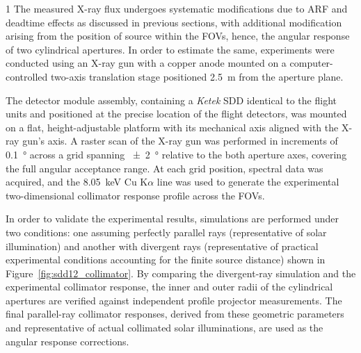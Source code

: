 \documentclass[12pt]{spieman}  %
\begin{document}
\begin{spacing}{1}
The measured X-ray flux undergoes systematic modifications due to ARF and deadtime effects as discussed in previous sections, with additional modification arising from the position of source within the FOVs, hence, the angular response of two cylindrical apertures. 
In order to estimate the same, experiments were conducted using an X-ray gun with a copper anode mounted on a computer-controlled two-axis translation stage positioned \SI{2.5}{\metre} from the aperture plane.%

The detector module assembly, containing a \textit{Ketek} SDD 
identical to the flight units and positioned at the precise location of the flight detectors, was mounted on a flat, height-adjustable platform with its mechanical  axis aligned with the X-ray gun's axis. A raster scan of the X-ray gun was performed in increments of \SI{0.1}{\degree} across a grid spanning \SI{\pm 2}{\degree} relative to the both aperture axes, covering the full angular acceptance range. At each grid position, spectral data was acquired, and the \SI{8.05}{\keV} Cu K$\alpha$ line was used to generate the experimental two-dimensional collimator response profile across the FOVs.
	
In order to validate the experimental results, simulations are performed under two conditions: one assuming perfectly parallel rays (representative of solar illumination) and another with divergent rays (representative of practical experimental conditions accounting for the finite source distance) shown in Figure~\ref{fig:sdd12_collimator}. By comparing the divergent-ray simulation and the experimental collimator response, the inner and outer radii of the cylindrical apertures are verified against independent profile projector measurements. The final parallel-ray collimator responses, derived from these geometric parameters and representative of actual collimated solar illuminations, are used as the angular response corrections. 


\begin{figure}[h!]
    \centering
    

\end{figure}
\end{spacing}
\end{document}
